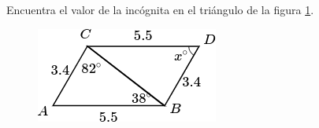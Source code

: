 Encuentra el valor de la incógnita en el triángulo de la figura \ref{fig:angle_triangle_23}.

\begin{minipage}[t][][t]{0.35\textwidth}
    \begin{figure}[H]
        \centering
        \includegraphics[width=0.9\linewidth]{../images/angle_triangle_23.png}
        \caption{}
        \label{fig:angle_triangle_23}
    \end{figure}
\end{minipage}\hfill
\begin{minipage}[t][][t]{0.6\textwidth}
    \begin{solutionbox}{4.5cm}

    \end{solutionbox}
\end{minipage}
